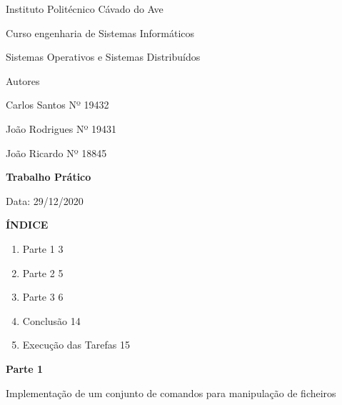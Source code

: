 \documentclass{article}
\begin{document}
	\centerline{Instituto Politécnico Cávado do Ave \linebreak}
	\vspace*{1 em}
	\centerline{Curso engenharia de Sistemas Informáticos \linebreak}
	\vspace*{1 em}
	\centerline{Sistemas Operativos e Sistemas Distribuídos\linebreak}
	\vspace*{5 em}
	
	\centerline{Autores}
	
	\vspace*{3 em}
	\centerline{Carlos Santos Nº 19432\linebreak}
	\vspace*{1 em}
	\centerline{João Rodrigues Nº 19431\linebreak}
	\vspace*{1 em}
	\centerline{João Ricardo Nº 18845 \linebreak}
	\vspace*{3 em}
	
	\centerline{\textbf{Trabalho Prático}}
	
	\vspace*{10 em}
	\centerline{Data: 29/12/2020}
	
	\newpage
	\centerline{\textbf{ÍNDICE}}
	\vspace*{3 em}
	
	\begin{enumerate}
		\item Parte 1 \hspace{30 em} 3 \\
		\item Parte 2 \hspace{30 em} 5\\
		\item Parte 3 \hspace{30 em} 6\\
		\item Conclusão \hspace{28,5 em} 14 \\
		\item Execução das Tarefas \hspace{24 em} 15 \\
	\end{enumerate}
	
	\newpage
	\centerline{\textbf{Parte 1}}
	\vspace*{1 em}
	\centerline{Implementação de um conjunto de comandos para manipulação de ficheiros}
	\vspace*{3 em}
	
\end{document}

